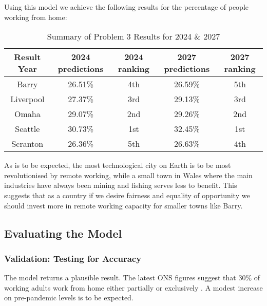            Using this model we achieve the following results for the percentage of people working from home:
                \begin{table}[h!]
                  \begin{center}
                    \label{tab:resultsFinal} %
                    \begin{tabular}{|c|c|c|c|c|} %
                      \toprule 
                       \textbf{Result Year} & \textbf{2024 predictions} & \textbf{2024 ranking} & \textbf{2027 predictions} & \textbf{2027 ranking} \\
                      \midrule 
                      Barry & 26.51\% & 4th & 26.59\% & 5th  \\
                      Liverpool & 27.37\% & 3rd & 29.13\% & 3rd  \\
                      Omaha & 29.07\% & 2nd & 29.26\% & 2nd  \\
                      Seattle & 30.73\% & 1st & 32.45\% & 1st  \\
                      Scranton & 26.36\% & 5th & 26.63\% & 4th  \\
                        
                      \bottomrule 
                    \end{tabular}
                    \caption{Summary of Problem 3 Results for 2024 \& 2027}                
                  \end{center}
                \end{table}
                
            As is to be expected, the most technological city on Earth is to be most revolutionised by remote working, while a small town in Wales where the main industries have always been mining and fishing \cite{barryStory} serves less to benefit. This suggests that as a country if we desire fairness and equality of opportunity we should invest more in remote working capacity for smaller towns like Barry.
            
        \subsection{Evaluating the Model}
            
            \subsubsection{Validation: Testing for Accuracy}
                The model returns a plausible result. The latest ONS figures suggest that 30\% of working adults work from home either partially or exclusively \cite{ONS3}. A modest increase on pre-pandemic levels is to be expected.
            
